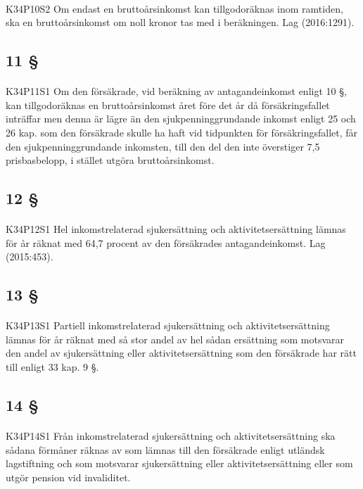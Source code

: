 \documentclass[a4paper,notitlepage,openany,10pt]{book}
\begin{document}
\paragraph*{}
{\tiny K34P10S2}
Om endast en bruttoårsinkomst kan tillgodoräknas inom ramtiden, ska en bruttoårsinkomst om noll kronor tas med i beräkningen.
Lag (2016:1291).
\subsection*{11 §}
\paragraph*{}
{\tiny K34P11S1}
Om den försäkrade, vid beräkning av antagandeinkomst enligt 10 §, kan tillgodoräknas en bruttoårsinkomst året före det år då försäkringsfallet inträffar men denna är lägre än den sjukpenninggrundande inkomst enligt 25 och 26 kap. som den försäkrade skulle ha haft vid tidpunkten för försäkringsfallet, får den sjukpenninggrundande inkomsten, till den del den inte överstiger 7,5 prisbasbelopp, i stället utgöra bruttoårsinkomst.
\subsection*{12 §}
\paragraph*{}
{\tiny K34P12S1}
Hel inkomstrelaterad sjukersättning och aktivitetsersättning lämnas för år räknat med 64,7 procent av den försäkrades antagandeinkomst.
Lag (2015:453).
\subsection*{13 §}
\paragraph*{}
{\tiny K34P13S1}
Partiell inkomstrelaterad sjukersättning och aktivitetsersättning lämnas för år räknat med så stor andel av hel sådan ersättning som motsvarar den andel av sjukersättning eller aktivitetsersättning som den försäkrade har rätt till enligt 33 kap. 9 §.
\subsection*{14 §}
\paragraph*{}
{\tiny K34P14S1}
Från inkomstrelaterad sjukersättning och aktivitetsersättning ska sådana förmåner räknas av som lämnas till den försäkrade enligt utländsk lagstiftning och som motsvarar sjukersättning eller aktivitetsersättning eller som utgör pension vid invaliditet.
\end{document}
